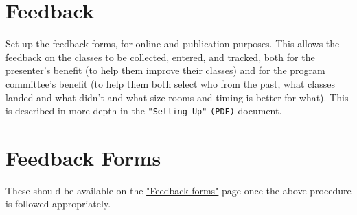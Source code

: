 \documentclass[captions=tablesignature]{scrartcl}
\begin{document}
\section{Feedback}
\label{sec-9}

Set up the feedback forms, for online and publication purposes.
This allows the feedback on the classes to be collected, entered,
and tracked, both for the presenter's benefit (to help them improve
their classes) and for the program committee's benefit (to help them
both select who from the past, what classes landed and what didn't
and what size rooms and timing is better for what).  This is
described in more depth in the \texttt{"Setting Up"} \texttt{(PDF)} document.

\section{Feedback Forms}
\label{sec-10}

These should be available on the \href{../webpages/StaffFeedback.php}{"Feedback forms"} page once the
above procedure is followed appropriately.
\end{document}
